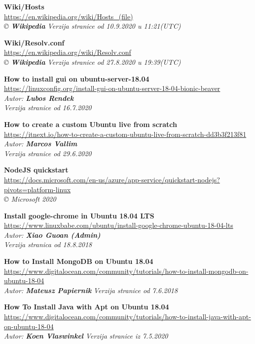\documentclass[12pt,vi]{mitthesis}
\begin{document}
\begin{thebibliography}{38}
\textbf{Wiki/Hosts}\\
\url{https://en.wikipedia.org/wiki/Hosts_(file)}\\
\textit{© \textbf{Wikipedia}}
\textit{Verzija stranice od 10.9.2020 u 11:21(UTC)}

\textbf{Wiki/Resolv.conf}\\
\url{https://en.wikipedia.org/wiki/Resolv.conf}\\
\textit{© \textbf{Wikipedia}}
\textit{Verzija stranice od 27.8.2020 u 19:39(UTC)}

\textbf{How to install gui on ubuntu-server-18.04}\\
\url{https://linuxconfig.org/install-gui-on-ubuntu-server-18-04-bionic-beaver}\\
\textit{Autor: \textbf{Lubos Rendek}}\\
\textit{Verzija stranice od 16.7.2020}

\textbf{How to create a custom Ubuntu live from scratch}\\
\url{https://itnext.io/how-to-create-a-custom-ubuntu-live-from-scratch-dd3b3f213f81}\\
\textit{Autor: \textbf{Marcos Vallim}}\\
\textit{Verzija stranice od 29.6.2020}

\textbf{NodeJS quickstart}\\
\url{https://docs.microsoft.com/en-us/azure/app-service/quickstart-nodejs?pivots=platform-linux}\\
\textit{© Microsoft 2020}

\textbf{Install google-chrome in Ubuntu 18.04 LTS}\\
\url{https://www.linuxbabe.com/ubuntu/install-google-chrome-ubuntu-18-04-lts}\\
\textit{Autor: \textbf{Xiao Guoan (Admin)}}\\
\textit{Verzija stranica od 18.8.2018}

\textbf{How to Install MongoDB on Ubuntu 18.04}\\
\url{https://www.digitalocean.com/community/tutorials/how-to-install-mongodb-on-ubuntu-18-04}\\
\textit{Autor: \textbf{Mateusz Papiernik}}
\textit{Verzija stranice od 7.6.2018}

\textbf{How To Install Java with Apt on Ubuntu 18.04}\\
\url{https://www.digitalocean.com/community/tutorials/how-to-install-java-with-apt-on-ubuntu-18-04}\\
\textit{Autor: \textbf{Koen Vlaswinkel}}
\textit{Verzija stranice iz 7.5.2020}


\end{thebibliography}
\end{document}
